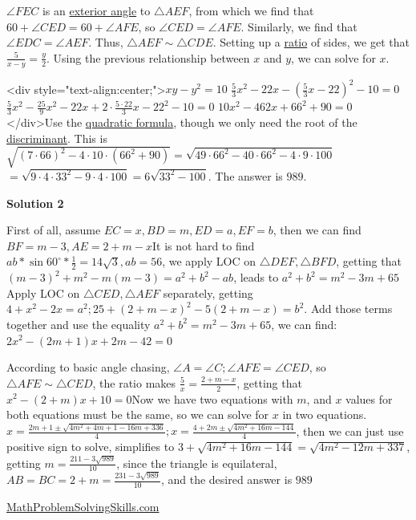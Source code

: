 \begin{enumerate}
 $\angle FEC$ is an \href{https://artofproblemsolving.com/wiki/index.php?title=Exterior\_angle}{exterior angle} to $\triangle AEF$, from which we find that $60 + \angle CED = 60 + \angle AFE$, so $\angle CED = \angle AFE$. Similarly, we find that $\angle EDC = \angle AEF$. Thus, $\triangle AEF \sim \triangle CDE$. Setting up a \href{https://artofproblemsolving.com/wiki/index.php?title=Ratio}{ratio} of sides, we get that $\frac{5}{x-y} = \frac{y}{2}$. Using the previous relationship between $x$ and $y$, we can solve for $x$.

 <div style="text-align:center;">$xy - y^2 = 10$
$\frac{5}{3}x^2 - 22x - \left(\frac{5}{3}x - 22\right)^2 - 10 = 0$
$\frac{5}{3}x^2 - \frac{25}{9}x^2 - 22x + 2 \cdot \frac{5 \cdot 22}{3}x - 22^2 - 10= 0$
$10x^2 - 462x + 66^2 + 90 = 0$
</div>Use the \href{https://artofproblemsolving.com/wiki/index.php?title=Quadratic\_formula}{quadratic formula}, though we only need the root of the \href{https://artofproblemsolving.com/wiki/index.php?title=Discriminant}{discriminant}. This is $\sqrt{(7 \cdot 66)^2 - 4 \cdot 10 \cdot (66^2 + 90)} = \sqrt{49 \cdot 66^2 - 40 \cdot 66^2 - 4 \cdot 9 \cdot 100}$$= \sqrt{9 \cdot 4 \cdot 33^2 - 9 \cdot 4 \cdot 100} = 6\sqrt{33^2 - 100}$. The answer is $\boxed{989}$.

 



\textbf{Solution 2}

First of all, assume $EC=x,BD=m, ED=a, EF=b$, then we can find $BF=m-3, AE=2+m-x$It is not hard to find $ab*\sin60^{\circ}*\frac{1}{2}=14\sqrt{3}, ab=56$, we apply LOC on $\triangle{DEF}, \triangle{BFD}$, getting that $(m-3)^2+m^2-m(m-3)=a^2+b^2-ab$, leads to $a^2+b^2=m^2-3m+65$Apply LOC on $\triangle{CED}, \triangle{AEF}$ separately, getting $4+x^2-2x=a^2; 25+(2+m-x)^2-5(2+m-x)=b^2.$ Add those terms together and use the equality $a^2+b^2=m^2-3m+65$, we can find:$2x^2-(2m+1)x+2m-42=0$

 According to basic angle chasing, $\angle{A}=\angle{C}; \angle{AFE}=\angle{CED}$, so $\triangle{AFE}\sim \triangle{CED}$, the ratio makes $\frac{5}{x}=\frac{2+m-x}{2}$, getting that $x^2-(2+m)x+10=0$Now we have two equations with $m$, and $x$ values for both equations must be the same, so we can solve for $x$ in two equations.$x=\frac{2m+1 \pm \sqrt{4m^2+4m+1-16m+336}}{4}; x=\frac{4+2m \pm \sqrt{4m^2+16m-144}}{4}$, then we can just use positive sign to solve, simplifies to $3+\sqrt{4m^2+16m-144}=\sqrt{4m^2-12m+337}$, getting $m=\frac{211-3\sqrt{989}}{10}$, since the triangle is equilateral, $AB=BC=2+m=\frac{231-3\sqrt{989}}{10}$, and the desired answer is $\boxed{989}$

 \href{https://mathproblemsolvingskills.wordpress.com/}{MathProblemSolvingSkills.com}

 


 


\end{enumerate}